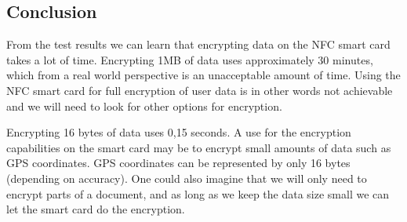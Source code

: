 \subsection{Conclusion}
From the test results we can learn that encrypting data on the NFC smart card takes a lot of time. Encrypting 1MB of data uses approximately 30 minutes, which from a real world perspective is an unacceptable amount of time. Using the NFC smart card for full encryption of user data is in other words not achievable and we will need to look for other options for encryption.

Encrypting 16 bytes of data uses 0,15 seconds. A use for the encryption capabilities on the smart card may be to encrypt small amounts of data such as GPS coordinates. GPS coordinates can be represented by only 16 bytes (depending on accuracy). One could also imagine that we will only need to encrypt parts of a document, and as long as we keep the data size small we can let the smart card do the encryption.
